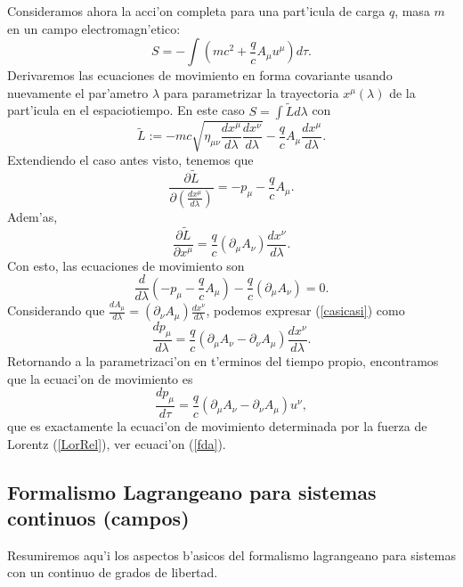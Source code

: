 Consideramos ahora la acci'on completa para una part'icula de carga $q$, masa
$m$ en un campo electromagn'etico:
\begin{equation}
\boxed{S=-\int \left(mc^2+ \frac{q}{c}A_\mu u^\mu \right) d\tau.}
\end{equation}
Derivaremos las ecuaciones de movimiento en forma covariante usando nuevamente
el par'ametro $\lambda$ para parametrizar la trayectoria $x^\mu(\lambda)$ de la
part'icula en el espaciotiempo. En este caso $S=\int \tilde{L}d\lambda$ con
\begin{equation}
\tilde{L}:=-mc\sqrt{\eta_{\mu\nu}\frac{dx^\mu}{d\lambda}\frac{dx^\nu}{d\lambda}}
-\frac{q}{c}A_\mu \frac{dx^\mu}{d\lambda}. \label{Ltilde2}
\end{equation}
Extendiendo el caso antes visto, tenemos que
\begin{equation}
 \frac{\partial\tilde{L}}{\partial\left(\frac{dx^\mu}{d\lambda}\right)}=-p_\mu
-\frac{q}{c}A_\mu.
\end{equation}
Adem'as,
\begin{equation}
\frac{\partial \tilde{L}}{\partial x^\mu}=\frac{q}{c}\left( \partial_\mu
A_\nu\right)  \frac{dx^\nu}{d\lambda}.
\end{equation}
Con esto, las ecuaciones de movimiento son
\begin{equation}
\frac{d}{d\lambda}\left( -p_\mu -\frac{q}{c}A_\mu\right) -\frac{q}{c}\left(
\partial_\mu A_\nu\right)=0. \label{casicasi}
\end{equation}
Considerando que $\frac{dA_\mu}{d\lambda}=\left( \partial_\nu A_\mu \right)
\frac{dx^\nu}{d\lambda}$, podemos expresar (\ref{casicasi}) como
\begin{equation}
\frac{dp_\mu}{d\lambda} =\frac{q}{c}\left( \partial_\mu A_\nu-\partial_\nu
A_\mu\right)\frac{dx^\nu}{d\lambda}.
\end{equation}
Retornando a la parametrizaci'on en t'erminos del tiempo propio, encontramos que
la ecuaci'on de movimiento es
\begin{equation}
\frac{dp_\mu}{d\tau} =\frac{q}{c}\left( \partial_\mu A_\nu-\partial_\nu
A_\mu\right)u^\nu,
\end{equation}
que es exactamente la ecuaci'on de movimiento determinada por la fuerza de
Lorentz (\ref{LorRel}), ver ecuaci'on (\ref{fda}).


\subsection{Formalismo Lagrangeano para sistemas continuos (campos)}
Resumiremos aqu'i los aspectos b'asicos del formalismo lagrangeano para sistemas
con un continuo de grados de libertad.

